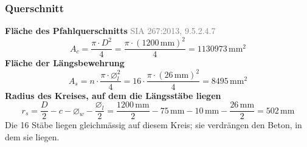 \documentclass[11pt,a4paper]{article}
\newcommand{\normref}[1]{{\small\textcolor{gray}{#1}}}
\begin{document}
\subsubsection{Querschnitt}
\noindent\textbf{Fläche des Pfahlquerschnitts} \hfill \normref{SIA 267:2013, 9.5.2.4.7}
\begin{equation*}
A_c = \frac{\pi \cdot D^{2}}{4} = \frac{\pi \cdot \left(1200\,\mathrm{mm}\right)^{2}}{4} = 1130973\,\mathrm{mm}^{2}
\end{equation*}
\noindent\textbf{Fläche der Längsbewehrung}
\begin{equation*}
A_s = n \cdot \frac{\pi \cdot \varnothing_l^{2}}{4} = 16 \cdot \frac{\pi \cdot \left(26\,\mathrm{mm}\right)^{2}}{4} = 8495\,\mathrm{mm}^{2}
\end{equation*}
\noindent\textbf{Radius des Kreises, auf dem die Längsstäbe liegen}
\begin{equation*}
r_s = \frac{D}{2} - c - \varnothing_w - \frac{\varnothing_l}{2} = \frac{1200\,\mathrm{mm}}{2} - 75\,\mathrm{mm} - 10\,\mathrm{mm} - \frac{26\,\mathrm{mm}}{2} = 502\,\mathrm{mm}
\end{equation*}
Die 16 Stäbe liegen gleichmässig auf diesem Kreis; sie verdrängen den Beton, in dem sie liegen.
\end{document}
